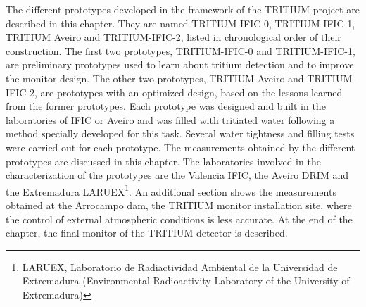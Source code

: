 The different prototypes developed in the framework of the TRITIUM project are described in this chapter. They are named TRITIUM-IFIC-0, TRITIUM-IFIC-1, TRITIUM Aveiro and TRITIUM-IFIC-2, listed in chronological order of their construction. The first two prototypes, TRITIUM-IFIC-0 and TRITIUM-IFIC-1, are preliminary prototypes used to learn about tritium detection and to improve the monitor design. The other two prototypes, TRITIUM-Aveiro and TRITIUM-IFIC-2, are prototypes with an optimized design, based on the lessons learned from the former prototypes. Each prototype was designed and built in the laboratories of IFIC or Aveiro and was filled with tritiated water following a method specially developed for this task. Several water tightness and filling tests were carried out for each prototype. The measurements obtained by the different prototypes are discussed in this chapter. The laboratories involved in the characterization of the prototypes are the Valencia IFIC, the Aveiro DRIM and the Extremadura LARUEX\footnote{LARUEX, Laboratorio de Radiactividad Ambiental de la Universidad de Extremadura (Environmental Radioactivity Laboratory of the University of Extremadura)}. An additional section shows the measurements obtained at the Arrocampo dam, the TRITIUM monitor installation site, where the control of external atmospheric conditions is less accurate. At the end of the chapter, the final monitor of the TRITIUM detector is described.